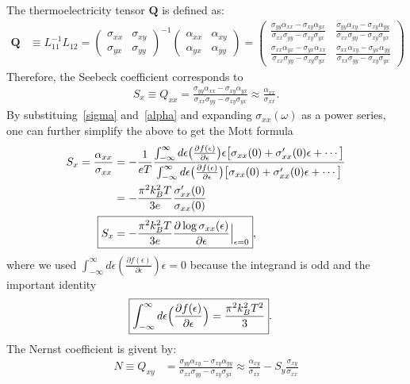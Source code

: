 \documentclass[notitlepage,11pt,nofootinbib]{revtex4-1}
\begin{document}
The thermoelectricity tensor $\boldsymbol{Q}$ is defined as:
\begin{align}
\boldsymbol{Q} &\equiv L_{11}^{-1}L_{12}
=
\begin{pmatrix}
\sigma_{xx} & \sigma_{xy}\\
\sigma_{yx} & \sigma_{yy}
\end{pmatrix}^{-1}
\begin{pmatrix}
\alpha_{xx} & \alpha_{xy}\\
\alpha_{yx} & \alpha_{yy}
\end{pmatrix}
=
\begin{pmatrix}
  \frac{\sigma_{yy}\alpha_{xx}-\sigma_{xy}\alpha_{yx}}
  {\sigma_{xx}\sigma_{yy}-\sigma_{xy}\sigma_{yx}} 
& \frac{\sigma_{yy}\alpha_{xy}-\sigma_{xy}\alpha_{yy}}
  {\sigma_{xx}\sigma_{yy}-\sigma_{xy}\sigma_{yx}}\\
  \frac{\sigma_{xx}\alpha_{yx}-\sigma_{yx}\alpha_{xx}}
  {\sigma_{xx}\sigma_{yy}-\sigma_{xy}\sigma_{yx}}
& \frac{\sigma_{xx}\alpha_{xy}-\sigma_{yx}\alpha_{yy}}
  {\sigma_{xx}\sigma_{yy}-\sigma_{xy}\sigma_{yx}}
\end{pmatrix}
\end{align}
Therefore, the Seebeck coefficient corresponds to
\begin{align}
S_x
\equiv 
Q_{xx} 
=
\frac{\sigma_{yy}\alpha_{xx}-\sigma_{xy}\alpha_{yx}}{\sigma_{xx}\sigma_{yy}-\sigma_{xy}\sigma_{yx}} 
\approx 
\boxed{
\frac{\alpha_{xx}}{\sigma_{xx}}
}.
\label{eq_seebeck}
\end{align}
By substituing~\eqref{sigma} and~\eqref{alpha} and expanding $\sigma_{xx}(\omega)$ as a power series, one can further simplify the above to get the Mott formula
\begin{align}
S_x = \frac{\alpha_{xx}}{\sigma_{xx}} 
&=
-\frac{1}{eT}
\frac{
\int_{-\infty}^{\infty}d\epsilon
\big(\frac{\partial f(\epsilon)}{\partial \epsilon}\big)\epsilon
\big[ \sigma_{xx}(0) + \sigma'_{xx}(0)\epsilon + \cdots \big]
}{
\int_{-\infty}^{\infty} d\epsilon
\big(\frac{\partial f(\epsilon)}{\partial \epsilon}\big)
\big[ \sigma_{xx}(0) + \sigma'_{xx}(0)\epsilon + \cdots \big]
}
\\
& = - \frac{\pi^2 k_B^2 T}{3e}\frac{ \sigma'_{xx}(0)}{ \sigma_{xx}(0)}
\\
\Aboxed{
S_x
& = - \frac{\pi^2 k_B^2 T}{3e}\frac{\partial \log \sigma_{xx}(\epsilon) }{\partial \epsilon}\Big\vert_{\epsilon=0}
},
\end{align}
where we used $\int_{-\infty}^{\infty}d\epsilon (\frac{\partial f(\epsilon)}{\partial \epsilon})\epsilon = 0$ because the integrand is odd and the important identity 
\begin{align}
\Aboxed{
\int_{-\infty}^{\infty}d\epsilon \Big(\frac{\partial f(\epsilon)}{\partial \epsilon}\Big) = \frac{\pi^2 k_B^2 T^2}{3}
}.
\end{align}
The Nernst coefficient is givent by:
\begin{align}
N 
\equiv
Q_{xy}
&= 
\frac{\sigma_{yy}\alpha_{xy}-\sigma_{xy}\alpha_{yy}}
{\sigma_{xx}\sigma_{yy}-\sigma_{xy}\sigma_{yx}}
\approx 
\boxed{
\frac{\alpha_{xy}}{\sigma_{xx}}
- S_{y}\frac{\sigma_{xy}}{\sigma_{xx}}
}
\end{align}
\end{document}

